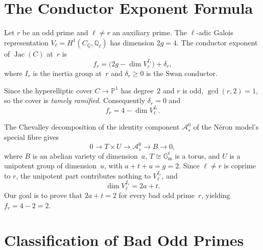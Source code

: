 \documentclass[11pt,a4paper]{article}
\newcommand{\Jac}{\operatorname{Jac}}
\newcommand{\Gm}{\mathbb{G}_{\mathrm{m}}}
\newcommand{\Qbar}{\overline{\mathbb{Q}}}
\newcommand{\Ql}{\mathbb{Q}_\ell}
\theoremstyle{definition}
\theoremstyle{remark}
\begin{document}
\section{The Conductor Exponent Formula}\label{sec:formula}

Let $r$ be an odd prime and $\ell \ne r$ an auxiliary prime.
The $\ell$-adic Galois representation
$V_\ell = H^1(C_{\Qbar},\Ql)$ has dimension $2g = 4$.
The conductor exponent of $\Jac(C)$ at~$r$ is
\begin{equation}\label{eq:cond-general}
  f_r = \bigl(2g - \dim V_\ell^{I_r}\bigr) + \delta_r,
\end{equation}
where $I_r$ is the inertia group at~$r$ and $\delta_r \ge 0$
is the Swan conductor.

Since the hyperelliptic cover $C \to \mathbb{P}^1$ has degree~$2$
and $r$ is odd, $\gcd(r, 2) = 1$, so the cover is \emph{tamely
ramified}.  Consequently $\delta_r = 0$ and
\begin{equation}\label{eq:cond-tame}
  f_r = 4 - \dim V_\ell^{I_r}.
\end{equation}

The Chevalley decomposition of the identity component
$\mathcal{A}_s^0$ of the N\'eron model's special fibre gives
\begin{equation}\label{eq:chevalley}
  0 \longrightarrow T \times U
  \longrightarrow \mathcal{A}_s^0
  \longrightarrow B \longrightarrow 0,
\end{equation}
where $B$ is an abelian variety of dimension~$a$, $T \cong \Gm^t$
is a torus, and $U$ is a unipotent group of dimension~$u$,
with $a + t + u = g = 2$.
Since $\ell \ne r$ is coprime to $r$, the unipotent part
contributes nothing to $V_\ell^{I_r}$, and
\begin{equation}\label{eq:dimVI}
  \dim V_\ell^{I_r} = 2a + t.
\end{equation}
Our goal is to prove that $2a + t = 2$ for every bad odd
prime~$r$, yielding $f_r = 4 - 2 = 2$.


\section{Classification of Bad Odd Primes}\label{sec:classify}
\end{document}
